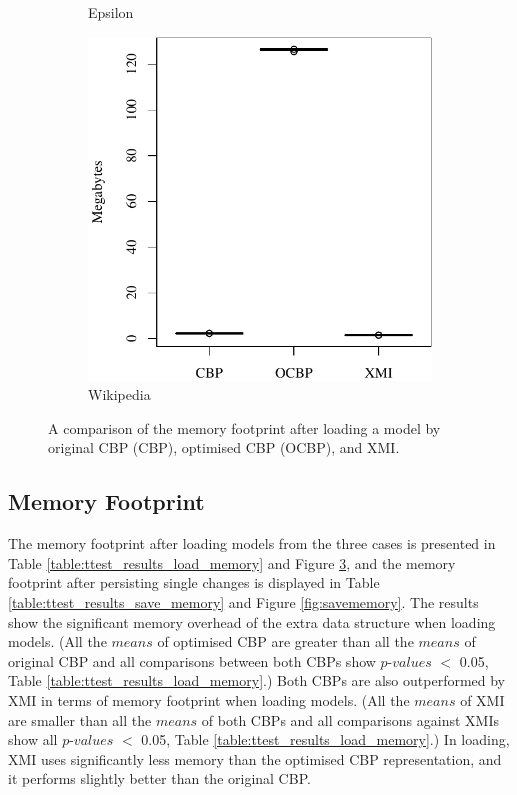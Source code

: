 \begin{figure}[ht]
\begin{subfigure}{0.325\textwidth}
      \caption{Epsilon}
      \label{fig:load_memory_epsilon}
    \end{subfigure}
    \hfill
    \begin{subfigure}{0.325\textwidth}
      \centering
      \includegraphics[width=\linewidth]{images/ol_load_memory_wikipedia}
      \caption{Wikipedia}
      \label{fig:load_memory_wikipedia}
    \end{subfigure}
    \caption{A comparison of the memory footprint after loading a model by original CBP (CBP), optimised CBP (OCBP), and XMI.}
    \label{fig:loadmemory}
  \end{figure}
 
  \subsection{Memory Footprint}
  \label{subsec:memory_consumption} 
  
  The memory footprint after loading models from the three cases is presented in Table \ref{table:ttest_results_load_memory} and Figure \ref{fig:loadmemory}, and the memory footprint after persisting single changes is displayed in Table \ref{table:ttest_results_save_memory} and Figure \ref{fig:savememory}. The results show the significant memory overhead of the extra data structure when loading models. (All the $means$ of optimised CBP are greater than all the $means$ of original CBP and all comparisons between both CBPs show $p$-$values$ $<$ 0.05, Table \ref{table:ttest_results_load_memory}.) Both CBPs are also outperformed by XMI in terms of memory footprint when loading models. (All the $means$ of XMI are smaller than all the $means$ of both CBPs and all comparisons against XMIs show all $p$-$values$ $<$ 0.05, Table \ref{table:ttest_results_load_memory}.) In loading, XMI uses significantly less memory than the optimised CBP representation, and it performs slightly better than the original CBP.
  
